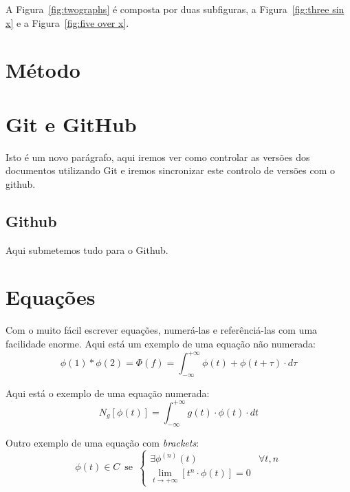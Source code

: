 \documentclass[11pt, a4paper]{article}
\begin{document}
    A Figura~\ref{fig:twographs} é composta por duas subfiguras, a Figura~\ref{fig:three sin x} e a Figura~\ref{fig:five over x}.

    \section{Método}\label{sec:metodo}

    \lipsum[6-7]

    \section{Git e GitHub}\label{sec:outrometodo}

    Isto é um novo parágrafo, aqui iremos ver como controlar as versões dos documentos utilizando Git e iremos sincronizar este controlo de versões com o github.

    \subsection{Github}\label{subsec:github}

    Aqui submetemos tudo para o Github.

    \section{Equações}\label{sec:equacoes}

    Com o  muito fácil escrever equações, numerá-las e referênciá-las com uma facilidade enorme.
    Aqui está um exemplo de uma equação não numerada:
    \[
        \phi(1) * \phi(2) = \Phi(f) = \int_{-\infty}^{+\infty}  \phi(t) + \phi(t+\tau) \cdot d\tau
    \]

    Aqui está o exemplo de uma equação numerada:
    \begin{equation}\label{eq:num-dist}
        N_g[\phi(t)] = \int_{-\infty}^{+\infty} g(t) \cdot \phi(t) \cdot dt
    \end{equation}

    Outro exemplo de uma equação com \emph{brackets}:
    \begin{equation}\label{eq:classe-c}
        \phi(t) \in C \, \text{ se } \,
        \begin{cases}
            \exists \phi^{(n)} (t) & \forall t,n \\
            \lim_{t \rightarrow +\infty} \left[t^n \cdot \phi(t)\right] = 0
        \end{cases}
    \end{equation}
\end{document}
